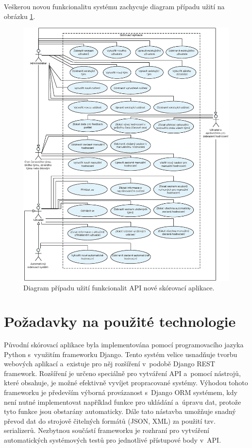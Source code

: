 \documentclass[
  digital,
  twoside,
  table, 
  nolof, 
  nolot
]{fithesis3}
\begin{document}
Veškerou novou funkcionalitu systému zachycuje diagram případu užití na obrázku \ref{fig:useCase2}.

\begin{figure}
    \centering
    \includegraphics[width=15cm]{images/Use-case-2.eps}
    \caption{Diagram případu užití funkcionalit API nové skórovací aplikace.}
    \label{fig:useCase2}
\end{figure}

\section{Požadavky na použité technologie}

Původní skórovací aplikace byla implementována pomocí programovacího jazyka Python s~využitím frameworku Django. Tento systém velice usnadňuje tvorbu webových aplikací a~existuje pro něj rozšíření v~podobě Django REST framework. Rozšíření je určeno speciálně pro vytváření API a~pomocí nástrojů, které obsahuje, je možné efektivně vyvíjet propracované systémy. Výhodou tohoto frameworku je především výborná provázanost s~Django ORM systémem, kdy není nutné implementovat například funkce pro ukládání a~úpravu dat, protože tyto funkce jsou obstarány automaticky. Dále tato nástavba umožňuje snadný převod dat do strojově čitelných formátů (JSON, XML) za použití tzv. serializerů. Nezbytnou součástí frameworku je rozhraní pro vytváření automatických systémových testů pro jednotlivé přístupové body v~API.
\end{document}
